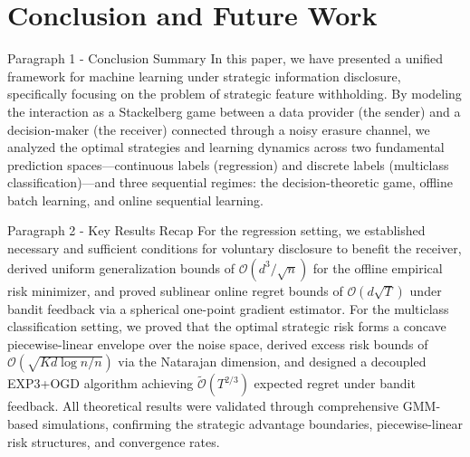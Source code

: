 \section{Conclusion and Future Work}
\label{sec:conclusion}

\begin{sourceblock}{Paragraph 1 - Conclusion Summary}
In this paper, we have presented a unified framework for machine learning under strategic information disclosure, specifically focusing on the problem of strategic feature withholding. By modeling the interaction as a Stackelberg game between a data provider (the sender) and a decision-maker (the receiver) connected through a noisy erasure channel, we analyzed the optimal strategies and learning dynamics across two fundamental prediction spaces—continuous labels (regression) and discrete labels (multiclass classification)—and three sequential regimes: the decision-theoretic game, offline batch learning, and online sequential learning.
\end{sourceblock}

\begin{faqblock}
\faqanswers
{}
\end{faqblock}

\begin{sourceblock}{Paragraph 2 - Key Results Recap}
For the regression setting, we established necessary and sufficient conditions for voluntary disclosure to benefit the receiver, derived uniform generalization bounds of $\mathcal{O}(d^3/\sqrt{n})$ for the offline empirical risk minimizer, and proved sublinear online regret bounds of $\mathcal{O}(d\sqrt{T})$ under bandit feedback via a spherical one-point gradient estimator. For the multiclass classification setting, we proved that the optimal strategic risk forms a concave piecewise-linear envelope over the noise space, derived excess risk bounds of $\mathcal{O}(\sqrt{Kd\log n / n})$ via the Natarajan dimension, and designed a decoupled EXP3+OGD algorithm achieving $\tilde{\mathcal{O}}(T^{2/3})$ expected regret under bandit feedback. All theoretical results were validated through comprehensive GMM-based simulations, confirming the strategic advantage boundaries, piecewise-linear risk structures, and convergence rates.
\end{sourceblock}

